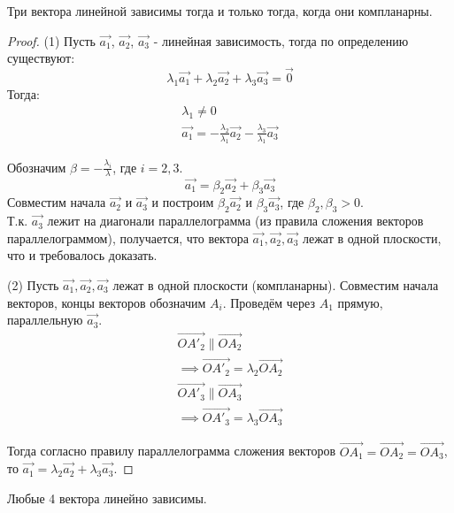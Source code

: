 \begin{theorem}
  Три вектора линейной зависимы тогда и только тогда, когда они компланарны.
\end{theorem}
\begin{proof}
  (1) Пусть $\vec{a_1}$, $\vec{a_2}$, $\vec{a_3}$ - линейная зависимость, тогда по определению существуют:
  \[
  \lambda_1 \vec{a_1} + \lambda_2 \vec{a_2} + \lambda_3 \vec{a_3} = \vec{0}
  \] 
  Тогда:
  \begin{gather*}
    \lambda_1 \neq 0 \\
    \vec{a_1} = -\frac{\lambda_2}{\lambda_1} \vec{a_2} - \frac{\lambda_3}{\lambda_1} \vec{a_3}
  \end{gather*}

  Обозначим $\beta = -\frac{\lambda_i}{\lambda}$, где $i = 2, 3$. \\
  \[
    \vec{a_1} = \beta_2 \vec{a_2} + \beta_3 \vec{a_3}
  \]
  Совместим начала $\vec{a_2}$ и $\vec{a_3}$ и построим $\beta_2 \vec{a_2}$ и $\beta_3 \vec{a_3}$, где $\beta_2, \beta_3 > 0$. \\
  Т.к. $\vec{a_3}$ лежит на диагонали параллелограмма (из правила сложения векторов параллелограммом), получается, что вектора $\vec{a_1}, \vec{a_2}, \vec{a_3}$ лежат в одной плоскости, что и требовалось доказать.

  (2) Пусть $\vec{a_1}, \vec{a_2}, \vec{a_3}$ лежат в одной плоскости (компланарны). Совместим начала векторов, концы векторов обозначим $A_i$. Проведём через $A_1$ прямую, параллельную $\vec{a_3}$.
  \begin{gather*}
    \overrightarrow{OA'_2} \parallel \overrightarrow{OA_2} \\
    \implies \overrightarrow{OA'_2} = \lambda_2 \overrightarrow{OA_2} \\
    \overrightarrow{OA'_3} \parallel \overrightarrow{OA_3} \\
    \implies \overrightarrow{OA'_3} = \lambda_3 \overrightarrow{OA_3}
  \end{gather*}

  Тогда согласно правилу параллелограмма сложения векторов $\overrightarrow{OA_1} = \overrightarrow{OA_2} = \overrightarrow{OA_3}$, то $\vec{a_1} = \lambda_2 \vec{a_2} + \lambda_3 \vec{a_3}$.
\end{proof}

\begin{theorem}
  Любые 4 вектора линейно зависимы.
\end{theorem}

